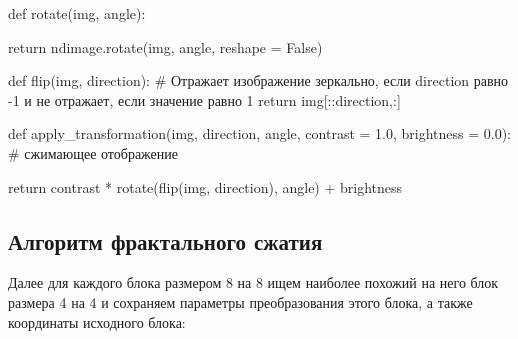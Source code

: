 \documentclass{article}
\begin{document}
{
def rotate(img, angle):

\hspace{1cm}	return ndimage.rotate(img, angle, reshape = False)

def flip(img, direction): \# Отражает изображение зеркально, если direction равно -1 и не отражает, если значение равно 1
\hspace{1cm}	return img[::direction,:]

def apply\_transformation(img, direction, angle, contrast = 1.0, brightness = 0.0): \# сжимающее отображение

\hspace{1cm}	return contrast * rotate(flip(img, direction), angle) + brightness
}
\vspace{1em}

\subsection{Алгоритм фрактального сжатия}

Далее для каждого блока размером 8 на 8 ищем наиболее похожий на него блок размера 4 на 4 и сохраняем параметры преобразования этого блока, а также координаты исходного блока:
\end{document}
